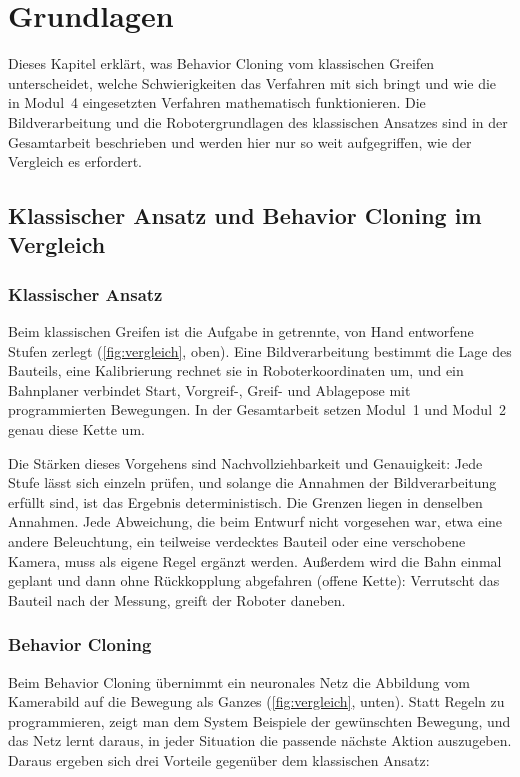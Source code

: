 \chapter{Grundlagen}
\label{ch:grundlagen}

Dieses Kapitel erklärt, was Behavior Cloning vom klassischen Greifen unterscheidet, welche
Schwierigkeiten das Verfahren mit sich bringt und wie die in Modul~4 eingesetzten Verfahren
mathematisch funktionieren. Die Bildverarbeitung und die Robotergrundlagen des klassischen
Ansatzes sind in der Gesamtarbeit beschrieben und werden hier nur so weit aufgegriffen, wie
der Vergleich es erfordert.

\section{Klassischer Ansatz und Behavior Cloning im Vergleich}
\label{sec:vergleich}

\subsection{Klassischer Ansatz}

Beim klassischen Greifen ist die Aufgabe in getrennte, von Hand entworfene Stufen zerlegt
(\cref{fig:vergleich}, oben). Eine Bildverarbeitung bestimmt die Lage des Bauteils, eine
Kalibrierung rechnet sie in Roboterkoordinaten um, und ein Bahnplaner verbindet Start,
Vorgreif-, Greif- und Ablagepose mit programmierten Bewegungen. In der Gesamtarbeit setzen
Modul~1 und Modul~2 genau diese Kette um.

Die Stärken dieses Vorgehens sind Nachvollziehbarkeit und Genauigkeit: Jede Stufe lässt sich
einzeln prüfen, und solange die Annahmen der Bildverarbeitung erfüllt sind, ist das Ergebnis
deterministisch. Die Grenzen liegen in denselben Annahmen. Jede Abweichung, die beim Entwurf
nicht vorgesehen war, etwa eine andere Beleuchtung, ein teilweise verdecktes Bauteil oder eine
verschobene Kamera, muss als eigene Regel ergänzt werden. Außerdem wird die Bahn einmal geplant
und dann ohne Rückkopplung abgefahren (offene Kette): Verrutscht das Bauteil nach der Messung,
greift der Roboter daneben.

\subsection{Behavior Cloning}

Beim Behavior Cloning übernimmt ein neuronales Netz die Abbildung vom Kamerabild auf die
Bewegung als Ganzes (\cref{fig:vergleich}, unten). Statt Regeln zu programmieren, zeigt man
dem System Beispiele der gewünschten Bewegung, und das Netz lernt daraus, in jeder Situation
die passende nächste Aktion auszugeben. Daraus ergeben sich drei Vorteile gegenüber dem
klassischen Ansatz:

